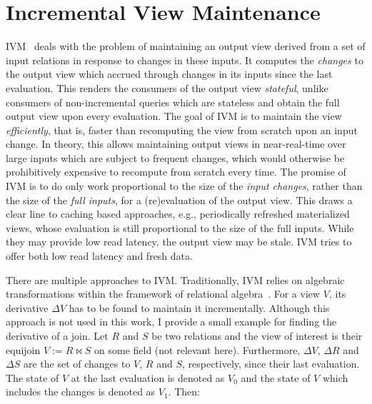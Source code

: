 \section{Incremental View Maintenance}\label{sec:ivm}

\Acf{IVM}~\cite{gupta1995maintenance} deals with the problem of maintaining
an output view derived from a set of input relations in response to changes
in these inputs.
It computes the \emph{changes} to the output view which accrued through
changes in its inputs since the last evaluation.
This renders the consumers of the output view \emph{stateful},
unlike consumers of non-incremental queries which are stateless
and obtain the full output view upon every evaluation.
The goal of \ac{IVM} is to maintain the view \emph{efficiently}, that is,
faster than recomputing the view from scratch upon an input change.
In theory, this allows maintaining output views in near-real-time over large
inputs which are subject to frequent changes, which would otherwise be
prohibitively expensive to recompute from scratch every time.
The promise of \ac{IVM} is to do only work proportional to the
size of the \emph{input changes}, rather than the size of the \emph{full inputs},
for a (re)evaluation of the output view.
This draws a clear line to caching based approaches, e.g., periodically
refreshed materialized views, whose evaluation is still proportional
to the size of the full inputs.
While they may provide low read latency, the output view may be stale.
\ac{IVM} tries to offer both low read latency and fresh data.

There are multiple approaches to \ac{IVM}.
Traditionally, \ac{IVM} relies on algebraic transformations within the framework
of relational algebra~\cite{gupta1995maintenance, gupta1993maintaining, pgivm}.
For a view \(V\), its derivative \(\Delta V\) has to be found to maintain
it incrementally.
Although this approach is not used in this work, I provide a small example
for finding the derivative of a join.
Let \(R\) and \(S\) be two relations and the view of interest is their
equijoin \(V := R \bowtie S\) on some field (not relevant here).
Furthermore, \(\Delta V\), \(\Delta R\) and \(\Delta S\) are the set of changes
to \(V\), \(R\) and \(S\), respectively, since their last evaluation.
The state of \(V\) at the last evaluation is denoted as \(V_0\) and the
state of \(V\) which includes the changes is denoted as \(V_1\). Then:

